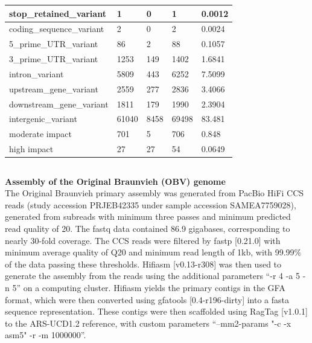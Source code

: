 \documentclass[../main.tex]{subfiles}
\begin{document}
\begin{flushleft}
\begin{table}[!htb]
\begin{tabular}{|l|l|l|l|l|}
    \hline
    stop\_retained\_variant      & 1             & 0               & 1            & 0.0012                    \\
    \hline
    coding\_sequence\_variant    & 2             & 0               & 2            & 0.0024                    \\
    \hline
    5\_prime\_UTR\_variant       & 86            & 2               & 88           & 0.1057                    \\
    \hline
    3\_prime\_UTR\_variant       & 1253          & 149             & 1402         & 1.6841                    \\
    \hline
    intron\_variant              & 5809          & 443             & 6252         & 7.5099                    \\
    \hline
    upstream\_gene\_variant      & 2559          & 277             & 2836         & 3.4066                    \\
    \hline
    downstream\_gene\_variant    & 1811          & 179             & 1990         & 2.3904                    \\
    \hline
    intergenic\_variant          & 61040         & 8458            & 69498        & 83.481                    \\
    \hline
    moderate impact              & 701           & 5               & 706          & 0.848                     \\
    \hline
    high impact                  & 27            & 27              & 54           & 0.0649                    \\
    \hline
    \end{tabular}
\end{table}

\newpage

\subsection{}
\label{sup_not:s41}
\normalsize
\textbf{Assembly of the Original Braunvieh (OBV) genome} \\
\bigskip
The Original Braunvieh primary assembly was generated from PacBio HiFi CCS reads (study accession PRJEB42335 under sample accession SAMEA7759028), generated from subreads with minimum three passes and minimum predicted read quality of 20.  The fastq data contained 86.9 gigabases, corresponding to nearly 30-fold coverage. The CCS reads were filtered by fastp [0.21.0] \citep{chen2018fastp} with minimum average quality of Q20 and minimum read length of 1kb, with 99.99\% of the data passing these thresholds. Hifiasm [v0.13-r308] \citep{cheng2021haplotype} was then used to generate the assembly from the reads using the additional parameters “-r 4 -a 5 -n 5” on a computing cluster. Hifiasm yields the primary contigs in the GFA format, which were then converted using gfatools [0.4-r196-dirty] into a fasta sequence representation. These contigs were then scaffolded using RagTag [v1.0.1] \citep{alonge2019ragoo} to the ARS-UCD1.2 reference, with custom parameters “--mm2-params "-c -x asm5" -r -m 1000000”.


\end{flushleft}
\end{document}
